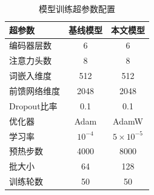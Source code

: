 \begin{table}[h]
\centering
\caption{模型训练超参数配置}
\label{tab:hyperparams}
{\renewcommand{\arraystretch}{0.65}
\begin{tabular}{|l|c|c|}
\hline
超参数 & 基线模型 & 本文模型 \\
\hline
编码器层数 & 6 & 6 \\
注意力头数 & 8 & 8 \\
词嵌入维度 & 512 & 512 \\
前馈网络维度 & 2048 & 2048 \\
Dropout比率 & 0.1 & 0.1 \\
优化器 & Adam & AdamW \\
学习率 & $10^{-4}$ & $5\times 10^{-5}$ \\
预热步数 & 4000 & 8000 \\
批大小 & 64 & 128 \\
训练轮数 & 50 & 50 \\
\hline
\end{tabular}}
\end{table}
